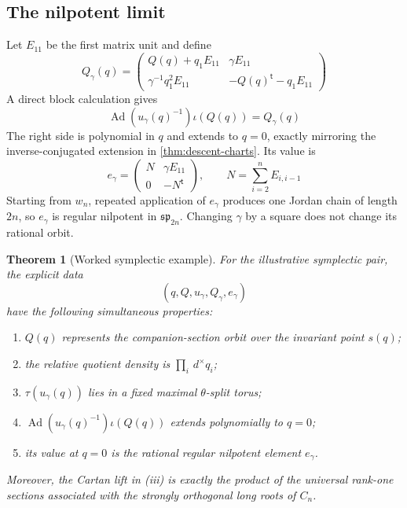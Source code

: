 \documentclass[11pt]{amsart}
\newtheorem{theorem}{Theorem}[section]
\theoremstyle{definition}
\theoremstyle{remark}
\newcommand{\Ad}{\operatorname{Ad}}
\newcommand{\dmeas}{\,d^{\times}}
\newcommand{\trans}{\mathsf t}
\newcommand{\splie}{\mathfrak{sp}}
\begin{document}
\subsection{The nilpotent limit}
Let $E_{11}$ be the first matrix unit and define
\begin{equation}\label{eq:typeCI-Qgamma}
 Q_\gamma(q)=
 \begin{pmatrix}
 Q(q)+q_1E_{11}&\gamma E_{11}\\
 \gamma^{-1}q_1^2E_{11}&-Q(q)^{\trans}-q_1E_{11}
 \end{pmatrix}
\end{equation}
A direct block calculation gives
\begin{equation}\label{eq:typeCI-conjugation}
 \Ad(u_\gamma(q)^{-1})\iota(Q(q))=Q_\gamma(q)
\end{equation}
The right side is polynomial in $q$ and extends to $q=0$, exactly mirroring
the inverse-conjugated extension in \cref{thm:descent-charts}.  Its value is
\[
 e_\gamma=
 \begin{pmatrix}
 N&\gamma E_{11}\\0&-N^{\trans}
 \end{pmatrix},
 \qquad
 N=\sum_{i=2}^nE_{i,i-1}
\]
Starting from $w_n$, repeated application of $e_\gamma$ produces one Jordan
chain of length $2n$, so $e_\gamma$ is regular nilpotent in $\splie_{2n}$.
Changing $\gamma$ by a square does not change its rational orbit.

\begin{theorem}[Worked symplectic example]\label{thm:typeCI-complete}
For the illustrative symplectic pair, the explicit data
\[
 (q,Q,u_\gamma,Q_\gamma,e_\gamma)
\]
have the following simultaneous properties:
\begin{enumerate}[label=\textup{(\roman*)},leftmargin=2.3em]
\item $Q(q)$ represents the companion-section orbit over the invariant point
      $s(q)$;
\item the relative quotient density is $\prod_i\dmeas q_i$;
\item $\tau(u_\gamma(q))$ lies in a fixed maximal $\theta$-split torus;
\item $\Ad(u_\gamma(q)^{-1})\iota(Q(q))$ extends polynomially to $q=0$;
\item its value at $q=0$ is the rational regular nilpotent element
      $e_\gamma$.
\end{enumerate}
Moreover, the Cartan lift in (iii) is exactly the product of the universal
rank-one sections associated with the strongly orthogonal long roots of
$C_n$.
\end{theorem}
\end{document}

